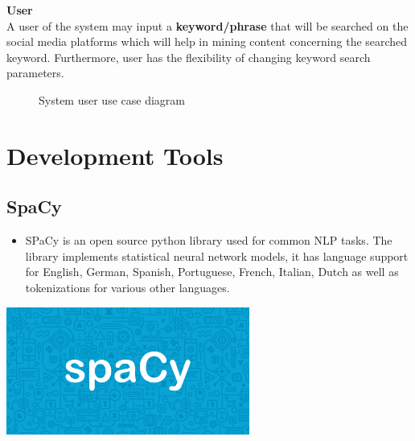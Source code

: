\clearpage
\textbf{User}\\
A user of the system may input a \textbf{keyword/phrase} that will be searched on the social media platforms which will help in mining content concerning the searched keyword. Furthermore, user has the
flexibility of changing keyword search parameters.

\begin{figure}[h]
  \centering
  \caption[System user use case diagram]%
  {System user use case diagram}
  \label{fig:ALAP:sm1}
\end{figure}



\section{Development Tools}

\subsection{SpaCy}

\begin{minipage}{0.4\textwidth}
\begin{itemize}
\item[\textbf{\emph{}}] 
SPaCy is an open source python library used for common NLP tasks. The library implements statistical neural network models, it has language support for English, German, Spanish, Portuguese, French, Italian, Dutch as well as tokenizations for various other languages.
\end{itemize}
\end{minipage}%
%
\begin{minipage}{0.4\textwidth}
\begin{center}
    \includegraphics[width=0.6\textwidth]{images/spacy_logo}
    \label{img:g}
\end{center}
\end{minipage}





